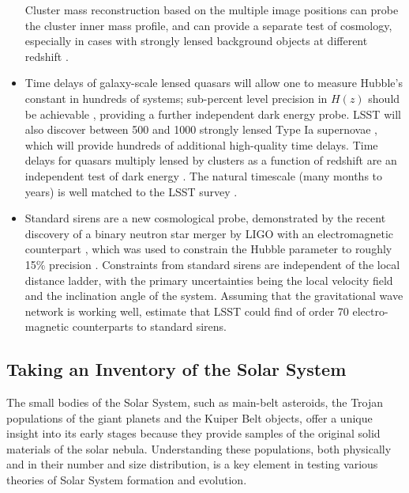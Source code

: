\begin{itemize}
Cluster mass reconstruction based on the multiple image positions
 can probe the cluster inner mass profile, and can provide a separate test of cosmology, especially
in cases with strongly lensed background objects at different redshift \citep{2000ApJ...532..679P,2003MNRAS.338L..25O}.
\item Time delays of galaxy-scale lensed quasars will allow one to measure Hubble's constant
\citep[e.g.,][]{2010ApJ...711..201S,2017MNRAS.465.4914B} in hundreds of systems; sub-percent level precision in
$H(z)$ should be achievable \citep{2009ApJ...706...45C,2016A&ARv..24...11T}, providing a further independent dark energy probe.
LSST will also discover between 500 and 1000 strongly lensed Type Ia supernovae \citep{2017ApJ...834L...5G,2017arXiv170800003G}, which will provide hundreds of additional high-quality time delays.
Time delays for quasars multiply lensed by clusters as a function of redshift are an independent test
of dark energy \citep{1997ApJ...482...75K}. The natural timescale (many months to years) is well matched
to the LSST survey \citep{2010MNRAS.405.2579O}.
\item Standard sirens are a new cosmological probe, demonstrated by the recent discovery of a binary
  neutron star merger by LIGO with an electromagnetic counterpart \citep{2017ApJ...848L..12A}, which was
  used to constrain the Hubble parameter to roughly 15\% precision \citep{2017Natur.551...85A}.
  Constraints from standard sirens are independent of the local distance ladder, with the primary
  uncertainties being the local velocity field and the inclination angle of the system.  Assuming that
  the gravitational wave network is working well, \citet{2018ApJ...852L...3S}
  estimate that LSST could find of order 70 electro-magnetic counterparts to standard sirens.
\end{itemize}


\subsection{Taking an Inventory of the Solar System}

The small bodies of the Solar System, such as main-belt asteroids,
the Trojan populations of the giant planets and the Kuiper Belt objects,
offer a unique insight into its early stages because they provide
samples of the original solid materials of the solar nebula.
Understanding these populations, both physically and in their number
and size distribution, is a key element in testing various theories of
Solar System formation and evolution.

